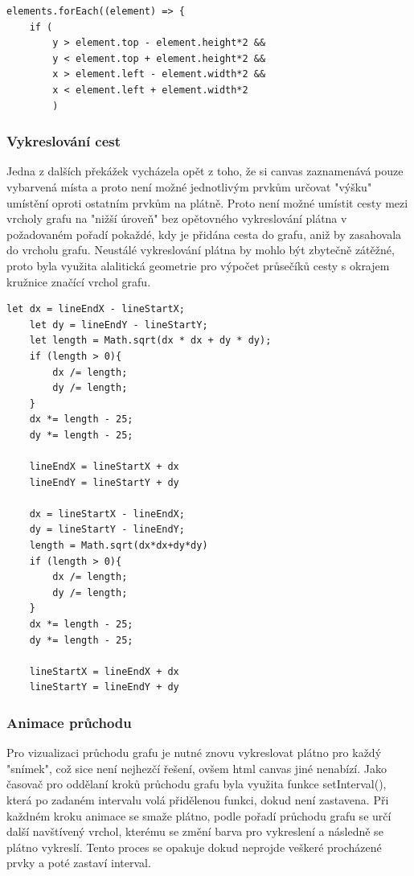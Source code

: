 \documentclass[12pt, titlepage, a4paper]{article}
\begin{document}
\begin{lstlisting}
elements.forEach((element) => {
    if (
        y > element.top - element.height*2 &&
        y < element.top + element.height*2 &&
        x > element.left - element.width*2 &&
        x < element.left + element.width*2
        )
\end{lstlisting}
\subsubsection{Vykreslování cest}
Jedna z dalších překážek vycházela opět z toho, že si canvas zaznamenává pouze
vybarvená místa a proto není možné jednotlivým prvkům určovat "výšku" \\ umístění
oproti ostatním prvkům na plátně. Proto není možné umístit cesty mezi vrcholy
grafu na "nižší úroveň" bez opětovného vykreslování plátna v požadovaném pořadí
pokaždé, kdy je přidána cesta do grafu, aniž by zasahovala do vrcholu grafu. 
Neustálé vykreslování plátna by mohlo být zbytečně zátěžné, proto byla využita alalitická
geometrie pro výpočet průsečíků cesty s okrajem kružnice
značící vrchol grafu.\par
\begin{lstlisting}
let dx = lineEndX - lineStartX;
    let dy = lineEndY - lineStartY;
    let length = Math.sqrt(dx * dx + dy * dy);
    if (length > 0){
        dx /= length;
        dy /= length;
    }
    dx *= length - 25;
    dy *= length - 25;

    lineEndX = lineStartX + dx
    lineEndY = lineStartY + dy

    dx = lineStartX - lineEndX;
    dy = lineStartY - lineEndY;
    length = Math.sqrt(dx*dx+dy*dy)
    if (length > 0){
        dx /= length;
        dy /= length;
    }
    dx *= length - 25;
    dy *= length - 25;

    lineStartX = lineEndX + dx
    lineStartY = lineEndY + dy
\end{lstlisting}
\subsubsection{Animace průchodu}
Pro vizualizaci průchodu grafu je nutné znovu vykreslovat plátno pro každý 
"snímek", což sice není nejhezčí řešení, ovšem html canvas jiné nenabízí.
Jako časovač pro oddělaní kroků průchodu grafu byla využita funkce setInterval(),
která po zadaném intervalu volá přidělenou funkci, dokud není zastavena. Při každném
kroku animace se smaže plátno, podle pořadí průchodu grafu se určí další navštívený 
vrchol, kterému se změní barva pro vykreslení a následně se plátno vykreslí. Tento
proces se opakuje dokud neprojde veškeré procházené prvky a poté zastaví interval.
\end{document}
